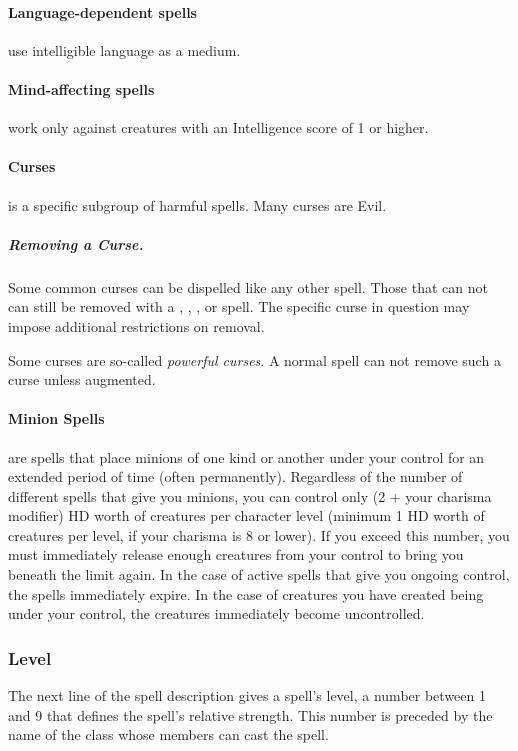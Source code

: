 \documentclass[../VancianToPsionics.tex]{subfiles}
\begin{document}
\paragraph{Language-dependent spells} use intelligible language as a medium.

\paragraph{Mind-affecting spells} work only against creatures with an Intelligence score of 1 or higher.

\paragraph[Curse]{Curses}
\label{sec:Curses} is a specific subgroup of harmful spells. Many curses are Evil.

\subparagraph[Removing a Curse]{Removing a Curse.} 
\label{sec:RemovingACurse} 
Some common curses can be dispelled like any other spell. Those that can not can still be removed with a , , , or  spell. The specific curse in question may impose additional restrictions on removal.

Some curses are so-called \emph{powerful curses}. A normal  spell can not remove such a curse unless augmented.

\paragraph[Minion]{Minion Spells} 
\label{sec:MinionSpells}
are spells that place minions of one kind or another under your control for an extended period of 
time (often permanently).
Regardless of the number of different spells that give you minions, you can control only (2 + your charisma modifier) HD worth of creatures per character level (minimum 1 HD worth of creatures per level, if your charisma is 8 or lower). 
If you exceed this number, you must immediately release enough creatures from your control to bring you beneath the limit again.
In the case of active spells that give you ongoing control, the spells immediately expire.
In the case of creatures you have created being under your control, the creatures immediately become uncontrolled.

\subsubsection{Level}
The next line of the spell description gives a spell's level, a number between 1 and 9 that defines the spell's relative strength. 
This number is preceded by the name of the class whose members can cast the spell.
\end{document}
